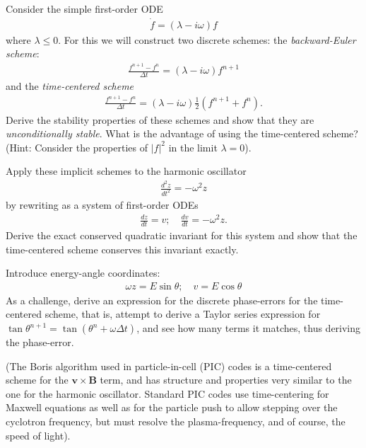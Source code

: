 \documentclass[12pt]{article}
\theoremstyle{definition}
\theoremstyle{definition}
\theoremstyle{definition}
\newcommand{\mvec}[1]{\mathbf{#1}}
\begin{document}
Consider the simple first-order ODE
\begin{align}
  \dot{f} = (\lambda-i\omega) f
\end{align}
where $\lambda \le 0$. For this we will construct two discrete
schemes: the \emph{backward-Euler scheme}:
\begin{align}
  \frac{f^{n+1} - f^n}{\Delta t} 
  =
  (\lambda-i\omega) f^{n+1}
\end{align}
and the \emph{time-centered scheme} 
\begin{align}
  \frac{f^{n+1} - f^n}{\Delta t} 
  =
  (\lambda-i\omega) \frac{1}{2}(f^{n+1} + f^n).
\end{align}
Derive the stability properties of these schemes and show that they
are \emph{unconditionally stable}. What is the advantage of using the
time-centered scheme? (Hint: Consider the properties of $|f|^2$ in the
limit $\lambda = 0$).

Apply these implicit schemes to the harmonic oscillator
\begin{align}
  \frac{d^2z}{dt^2} = -\omega^2 z
\end{align}
by rewriting as a system of first-order ODEs
\begin{align}
  \frac{dz}{dt} = v; \quad \frac{dv}{dt} = -\omega^2 z.
\end{align}
Derive the exact conserved quadratic invariant for this system and
show that the time-centered scheme conserves this invariant exactly.

Introduce energy-angle coordinates:
\begin{align}
  \omega z = E\sin\theta; \quad v = E\cos\theta
\end{align}
As a challenge, derive an expression for the discrete phase-errors for
the time-centered scheme, that is, attempt to derive a Taylor series
expression for $\tan\theta^{n+1} = \tan(\theta^n + \omega\Delta t)$,
and see how many terms it matches, thus deriving the phase-error.

(The Boris algorithm used in particle-in-cell (PIC) codes is a
time-centered scheme for the $\mvec{v}\times\mvec{B}$ term, and has
structure and properties very similar to the one for the harmonic
oscillator. Standard PIC codes use time-centering for Maxwell
equations as well as for the particle push to allow stepping over the
cyclotron frequency, but must resolve the plasma-frequency, and of
course, the speed of light).
\end{document}
